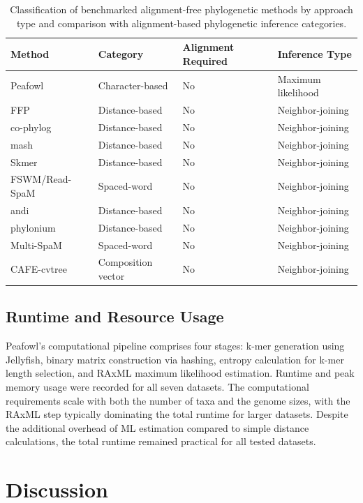 \documentclass[12pt]{article}
\begin{document}
\begin{table}[ht]
\centering
\caption{Classification of benchmarked alignment-free phylogenetic methods by approach type and comparison with alignment-based phylogenetic inference categories.}
\label{tab:methods}
\begin{tabular}{llll}
\toprule
\textbf{Method} & \textbf{Category} & \textbf{Alignment Required} & \textbf{Inference Type} \\
\midrule
Peafowl & Character-based & No & Maximum likelihood \\
FFP & Distance-based & No & Neighbor-joining \\
co-phylog & Distance-based & No & Neighbor-joining \\
mash & Distance-based & No & Neighbor-joining \\
Skmer & Distance-based & No & Neighbor-joining \\
FSWM/Read-SpaM & Spaced-word & No & Neighbor-joining \\
andi & Distance-based & No & Neighbor-joining \\
phylonium & Distance-based & No & Neighbor-joining \\
Multi-SpaM & Spaced-word & No & Neighbor-joining \\
CAFE-cvtree & Composition vector & No & Neighbor-joining \\
\bottomrule
\end{tabular}
\end{table}

\subsection{Runtime and Resource Usage}

Peafowl's computational pipeline comprises four stages: k-mer generation using Jellyfish, binary matrix construction via hashing, entropy calculation for k-mer length selection, and RAxML maximum likelihood estimation. Runtime and peak memory usage were recorded for all seven datasets. The computational requirements scale with both the number of taxa and the genome sizes, with the RAxML step typically dominating the total runtime for larger datasets. Despite the additional overhead of ML estimation compared to simple distance calculations, the total runtime remained practical for all tested datasets.

\section{Discussion}
\end{document}
